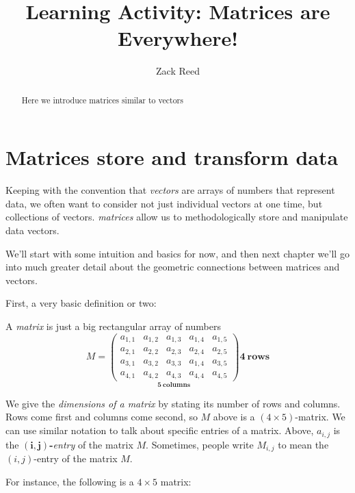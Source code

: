 \documentclass{ximera}
\author{Zack Reed} %
\title{Learning Activity: Matrices are Everywhere!}
\begin{document}
\begin{abstract}
Here we introduce matrices similar to vectors
\end{abstract}
\maketitle


\section{Matrices store and transform data}

Keeping with the convention that \emph{vectors} are arrays of numbers that represent data, we often want to consider not just individual vectors at one time, but collections of vectors. \emph{matrices} allow us to methodologically store and manipulate data vectors.

We'll start with some intuition and basics for now, and then next chapter we'll go into much greater detail about the geometric connections between matrices and vectors.

First, a very basic definition or two:

\begin{definition}

A \emph{matrix} is just a big rectangular array of numbers
\[
M =
\underset{\displaystyle\boldsymbol{5}~\textbf{columns}}{\begin{pmatrix}
  a_{1,1} & a_{1,2} & a_{1,3} & a_{1,4} & a_{1,5} \\
  a_{2,1} & a_{2,2} & a_{2,3} & a_{2,4} & a_{2,5} \\
  a_{3,1} & a_{3,2} & a_{3,3} & a_{1,4} & a_{3,5} \\
  a_{4,1} & a_{4,2} & a_{4,3} & a_{4,4} & a_{4,5}
\end{pmatrix}}
\boldsymbol{4}~\textbf {rows}
\]

We give the \emph{dimensions of a matrix} by stating its number of rows
and columns. Rows come first and columns come second, so $M$ above is
a $(4\times 5)$-matrix. We can use similar notation to talk about
specific entries of a matrix. Above, $a_{i,j}$ is the
$\boldsymbol{(i,j)}${\bf-}\emph{entry} of the matrix $M$. Sometimes,
people write $M_{i,j}$ to mean the $(i,j)$-entry of the matrix $M$.

\end{definition}

For instance, the following is a $4\times 5$ matrix:
\end{document}
